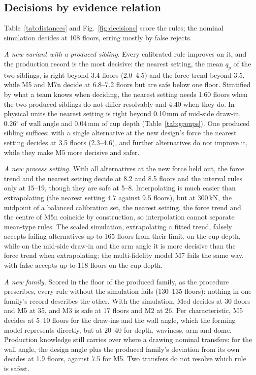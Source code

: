 \documentclass[pdflatex,sn-basic,lineno]{sn-jnl}
\begin{document}
\subsection{Decisions by evidence relation}\label{sec:res-decisions}

Table~\ref{tab:distances} and Fig.~\ref{fig:decisions} score the rules; the nominal simulation decides at 108 floors, erring mostly by false rejects.

\emph{A new variant with a produced sibling.} Every calibrated rule improves on it, and the production record is the most decisive: the nearest setting, the mean $q_p$ of the two siblings, is right beyond 3.4 floors (2.0--4.5) and the force trend beyond 3.5, while M5 and M7n decide at 6.8--7.2 floors but are safe below one floor. Stratified by what a team knows when deciding, the nearest setting needs 1.60 floors when the two produced siblings do not differ resolvably and 4.40 when they do. In physical units the nearest setting is right beyond 0.10\,mm of mid-side draw-in, 0.26$^\circ$ of wall angle and 0.04\,mm of cup depth (Table~\ref{tab:groups}). One produced sibling suffices: with a single alternative at the new design's force the nearest setting decides at 3.5 floors (2.3--4.6), and further alternatives do not improve it, while they make M5 more decisive and safer.

\emph{A new process setting.} With all alternatives at the new force held out, the force trend and the nearest setting decide at 8.2 and 8.5 floors and the interval rules only at 15--19, though they are safe at 5--8. Interpolating is much easier than extrapolating (the nearest setting 4.7 against 9.5 floors), but at 300\,kN, the midpoint of a balanced calibration set, the nearest setting, the force trend and the centre of M5n coincide by construction, so interpolation cannot separate mean-type rules. The scaled simulation, extrapolating a fitted trend, falsely accepts failing alternatives up to 165 floors from their limit, on the cup depth, while on the mid-side draw-in and the arm angle it is more decisive than the force trend when extrapolating; the multi-fidelity model M7 fails the same way, with false accepts up to 118 floors on the cup depth.

\emph{A new family.} Scored in the floor of the produced family, as the procedure prescribes, every rule without the simulation fails (130--135 floors): nothing in one family's record describes the other. With the simulation, Mcd decides at 30 floors and M5 at 35, and M3 is safe at 17 floors and M2 at 26. Per characteristic, M5 decides at 5--10 floors for the draw-ins and the wall angle, which the forming model represents directly, but at 20--40 for depth, waviness, arm and dome. Production knowledge still carries over where a drawing nominal transfers: for the wall angle, the design angle plus the produced family's deviation from its own decides at 1.9 floors, against 7.5 for M5. Two transfers do not resolve which rule is safest.
\end{document}
